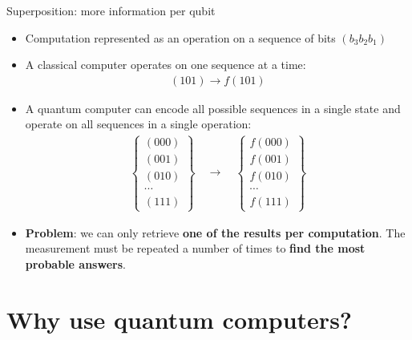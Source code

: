 \documentclass[aspectratio=169,12pt]{beamer}
\begin{document}
\begin{frame}{Superposition: more information per qubit}
    \begin{itemize}[<+->]
        \item Computation represented as an operation on a sequence of bits $(b_3 b_2 b_1)$
        \item A classical computer operates on one sequence at a time: %
        \begin{align*}
            (101) \longrightarrow f(101)
        \end{align*}
        \item A quantum computer can encode all possible sequences in a single state and operate on all sequences in a single operation:
        \begin{align*}
            \begin{Bmatrix}
                (000) \\ (001) \\ (010) \\ \cdots \\ (111)
            \end{Bmatrix}
            \quad \longrightarrow \quad
            \begin{Bmatrix}
                f(000) \\ f(001) \\ f(010) \\ \cdots \\ f(111)
            \end{Bmatrix}
        \end{align*}
        \item \textbf{Problem}: we can only retrieve \textbf{one of the results per computation}. The measurement must be repeated a number of times to \textbf{find the most probable answers}.
    \end{itemize}
\end{frame}

\section{Why use quantum computers?}
\end{document}
